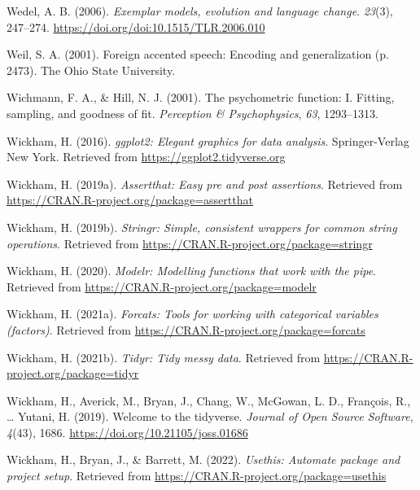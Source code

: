 \documentclass[
  11pt,
  english,
  man,floatsintext]{apa6}
\newlength{\cslhangindent}
\newlength{\cslentryspacingunit} %
\newenvironment{CSLReferences}[2] %
 {%
  \setlength{\parindent}{0pt}
  \ifodd #1
  \let\oldpar\par
  \def\par{\hangindent=\cslhangindent\oldpar}
  \fi
  \setlength{\parskip}{#2\cslentryspacingunit}
 }%
 {}
\begin{document}
\begin{CSLReferences}{1}{0}
\leavevmode{}%
Wedel, A. B. (2006). \emph{Exemplar models, evolution and language change}. \emph{23}(3), 247--274. \url{https://doi.org/doi:10.1515/TLR.2006.010}

\leavevmode{}%
Weil, S. A. (2001). Foreign accented speech: Encoding and generalization (p. 2473). The Ohio State University.

\leavevmode{}%
Wichmann, F. A., \& Hill, N. J. (2001). The psychometric function: I. Fitting, sampling, and goodness of fit. \emph{Perception \& Psychophysics}, \emph{63}, 1293--1313.

\leavevmode{}%
Wickham, H. (2016). \emph{ggplot2: Elegant graphics for data analysis}. Springer-Verlag New York. Retrieved from \url{https://ggplot2.tidyverse.org}

\leavevmode{}%
Wickham, H. (2019a). \emph{Assertthat: Easy pre and post assertions}. Retrieved from \url{https://CRAN.R-project.org/package=assertthat}

\leavevmode{}%
Wickham, H. (2019b). \emph{Stringr: Simple, consistent wrappers for common string operations}. Retrieved from \url{https://CRAN.R-project.org/package=stringr}

\leavevmode{}%
Wickham, H. (2020). \emph{Modelr: Modelling functions that work with the pipe}. Retrieved from \url{https://CRAN.R-project.org/package=modelr}

\leavevmode{}%
Wickham, H. (2021a). \emph{Forcats: Tools for working with categorical variables (factors)}. Retrieved from \url{https://CRAN.R-project.org/package=forcats}

\leavevmode{}%
Wickham, H. (2021b). \emph{Tidyr: Tidy messy data}. Retrieved from \url{https://CRAN.R-project.org/package=tidyr}

\leavevmode{}%
Wickham, H., Averick, M., Bryan, J., Chang, W., McGowan, L. D., François, R., \ldots{} Yutani, H. (2019). Welcome to the {tidyverse}. \emph{Journal of Open Source Software}, \emph{4}(43), 1686. \url{https://doi.org/10.21105/joss.01686}

\leavevmode{}%
Wickham, H., Bryan, J., \& Barrett, M. (2022). \emph{Usethis: Automate package and project setup}. Retrieved from \url{https://CRAN.R-project.org/package=usethis}


\end{CSLReferences}
\end{document}
